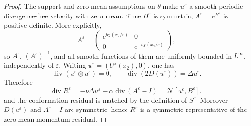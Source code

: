 \documentclass[10pt,a4paper]{amsart}
\newcommand{\Id}{I}
\newcommand{\calN}{\mathcal N}
\newcommand{\divv}{\operatorname{div}}
\newcommand{\eps}{\varepsilon}
\begin{document}
\begin{proof}
The support and zero-mean assumptions on \(\theta\) make
\(u^\varepsilon\) a smooth periodic divergence-free velocity with zero mean.
Since \(B^\varepsilon\) is symmetric, \(A^\varepsilon=e^{B^\varepsilon}\) is
positive definite.  More explicitly,
\[
  A^\varepsilon
  =
  \begin{pmatrix}
  e^{b\chi(x_2/\eps)}&0\\
  0&e^{-b\chi(x_2/\eps)}
  \end{pmatrix},
\]
so \(A^\varepsilon\), \((A^\varepsilon)^{-1}\), and all smooth functions of
them are uniformly bounded in \(L^\infty\), independently of \(\eps\).
Writing \(u^\varepsilon=(U^\varepsilon(x_2),0)\), one has
\[
  \divv(u^\varepsilon\otimes u^\varepsilon)=0,\qquad
  \divv(2D(u^\varepsilon))=\Delta u^\varepsilon.
\]
Therefore
\[
  \divv R^\varepsilon
  =
  -\nu\Delta u^\varepsilon-\alpha\divv(A^\varepsilon-\Id)
  =
  \calN[u^\varepsilon,B^\varepsilon],
\]
and the conformation residual is matched by the definition of
\(S^\varepsilon\).  Moreover \(D(u^\varepsilon)\) and
\(A^\varepsilon-\Id\) are symmetric, hence \(R^\varepsilon\) is a symmetric
representative of the zero-mean momentum residual.


\end{proof}
\end{document}
